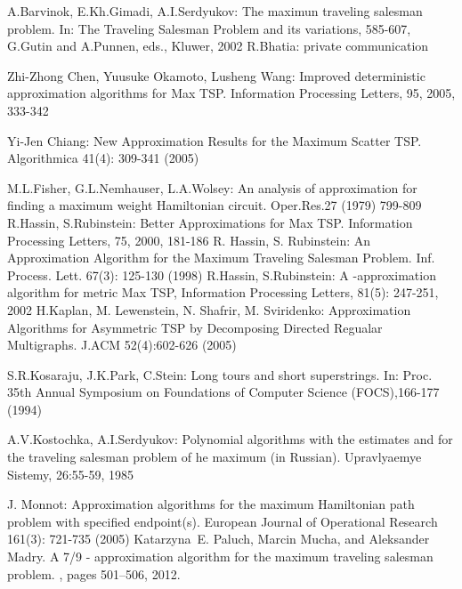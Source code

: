 \documentclass[a4, 11pt]{article}
\newcommand{\<}{\langle}
\renewcommand{\>}{\rangle}
\begin{document}
\begin{thebibliography}{99}
 A.Barvinok, E.Kh.Gimadi, A.I.Serdyukov: The maximun traveling salesman problem.
In: The Traveling Salesman Problem and its variations, 585-607, G.Gutin and A.Punnen, eds., Kluwer, 2002
 R.Bhatia: private communication

 Zhi-Zhong Chen, Yuusuke Okamoto, Lusheng Wang: Improved deterministic approximation algorithms for Max TSP.
Information Processing Letters, 95, 2005, 333-342

 Yi-Jen Chiang: New Approximation Results for the Maximum Scatter TSP. Algorithmica 41(4): 309-341 (2005)


 M.L.Fisher, G.L.Nemhauser, L.A.Wolsey: An analysis of approximation for finding a maximum weight Hamiltonian circuit. Oper.Res.27 (1979) 799-809
 R.Hassin, S.Rubinstein: Better Approximations for Max TSP. Information Processing Letters, 75, 2000,
181-186
 R. Hassin, S. Rubinstein: An Approximation Algorithm for the Maximum Traveling Salesman Problem. Inf. Process. Lett. 67(3): 125-130 (1998)
 R.Hassin, S.Rubinstein: A -approximation algorithm for metric Max TSP,  Information Processing Letters, 81(5): 247-251, 2002
 H.Kaplan, M. Lewenstein, N. Shafrir, M. Sviridenko: Approximation Algorithms for Asymmetric TSP by
Decomposing Directed Regualar Multigraphs. J.ACM 52(4):602-626 (2005)

 S.R.Kosaraju, J.K.Park, C.Stein: Long tours and short superstrings. In: Proc. 35th Annual Symposium on
Foundations of Computer Science (FOCS),166-177 (1994)

 A.V.Kostochka, A.I.Serdyukov: Polynomial algorithms with the estimates  and 
for the traveling salesman problem of he maximum (in Russian). Upravlyaemye Sistemy, 26:55-59, 1985

 J. Monnot: Approximation algorithms for the maximum Hamiltonian path problem with specified endpoint(s). European Journal of Operational Research 161(3): 721-735 (2005)
Katarzyna~E. Paluch, Marcin Mucha, and Aleksander Madry.
\newblock A 7/9 - approximation algorithm for the maximum traveling salesman
  problem.
, pages 501--506, 2012.


\end{thebibliography}
\end{document}
